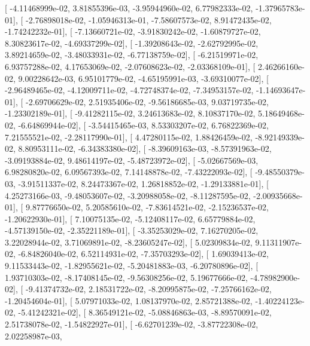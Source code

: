 \documentclass{article}
\begin{document}
       [ -4.11468999e-02,   3.81855396e-03,  -3.95944960e-02,
          6.77982333e-02,  -1.37965783e-01],
       [ -2.76898018e-02,  -1.05946313e-01,  -7.58607573e-02,
          8.91472435e-02,  -1.74242232e-01],
       [ -7.13660721e-02,  -3.91830242e-02,  -1.60879727e-02,
          8.30823617e-02,  -4.69337299e-02],
       [ -1.39208643e-02,  -2.62792995e-02,   3.89214659e-02,
         -3.48033931e-02,  -6.77138759e-02],
       [ -6.21519971e-02,   6.93757288e-02,   4.17653069e-02,
         -2.07608623e-02,  -2.03368109e-01],
       [  2.46266160e-02,   9.00228642e-03,   6.95101779e-02,
         -4.65195991e-03,  -3.69310077e-02],
       [ -2.96489465e-02,  -4.12009711e-02,  -4.72748374e-02,
         -7.34953157e-02,  -1.14693647e-01],
       [ -2.69706629e-02,   2.51935406e-02,  -9.56186685e-03,
          9.03719735e-02,  -1.23302189e-01],
       [ -9.41282115e-02,   3.24613683e-02,   8.10837170e-02,
          5.18649468e-02,  -6.64869944e-02],
       [ -3.54415465e-03,   8.53303207e-02,   6.76822369e-02,
          7.21555521e-02,  -2.28117990e-01],
       [  4.47280115e-02,   1.88426459e-02,  -8.92149339e-02,
          8.80953111e-02,  -6.34383380e-02],
       [ -8.39609163e-03,  -8.57391963e-02,  -3.09193884e-02,
          9.48614197e-02,  -5.48723972e-02],
       [ -5.02667569e-03,   6.98280820e-02,   6.09567393e-02,
          7.14148878e-02,  -7.43222093e-02],
       [ -9.48550379e-03,  -3.91511337e-02,   8.24473367e-02,
          1.26818852e-02,  -1.29133881e-01],
       [  4.25273166e-03,  -9.48053607e-02,  -3.20988058e-02,
         -8.11287595e-02,  -2.00935668e-01],
       [  9.87776650e-02,   5.20585610e-02,  -7.83614521e-02,
         -2.15236537e-02,  -1.20622930e-01],
       [  7.10075135e-02,  -5.12408117e-02,   6.65779884e-02,
         -4.57139150e-02,  -2.35221189e-01],
       [ -3.35253029e-02,   7.16270205e-02,   3.22028944e-02,
          3.71069891e-02,  -8.23605247e-02],
       [  5.02309834e-02,   9.11311907e-02,  -6.84826040e-02,
          6.52114931e-02,  -7.35703293e-02],
       [  1.69039413e-02,   9.11533443e-02,  -1.82955621e-02,
         -5.20481883e-03,  -6.20780896e-02],
       [  1.93710303e-02,  -8.17408145e-02,  -9.56308256e-02,
          5.19677666e-02,  -4.78982900e-02],
       [ -9.41374732e-02,   2.18531722e-02,  -8.20995875e-02,
         -7.25766162e-02,  -1.20454604e-01],
       [  5.07971033e-02,   1.08137970e-02,   2.85721388e-02,
         -1.40224123e-02,  -5.41242321e-02],
       [  8.36549121e-02,  -5.08846863e-03,  -8.89570091e-02,
          2.51738078e-02,  -1.54822927e-01],
       [ -6.62701239e-02,  -3.87722308e-02,   2.02258987e-03,
\end{document}
